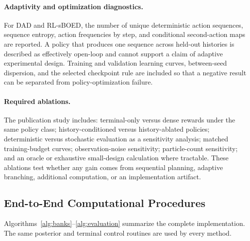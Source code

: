\documentclass[11pt]{article}
\begin{document}
\paragraph{Adaptivity and optimization diagnostics.}
For DAD and RL-sBOED, the number of unique deterministic action sequences,
sequence entropy, action frequencies by step, and conditional second-action
maps are reported. A policy that produces one sequence across held-out
histories is described as effectively open-loop and cannot support a claim of
adaptive experimental design. Training and validation learning curves,
between-seed dispersion, and the selected checkpoint rule are included so
that a negative result can be separated from policy-optimization failure.

\paragraph{Required ablations.}
The publication study includes: terminal-only versus dense rewards under the
same policy class; history-conditioned versus history-ablated policies;
deterministic versus stochastic evaluation as a sensitivity analysis; matched
training-budget curves; observation-noise sensitivity; particle-count
sensitivity; and an oracle or exhaustive small-design calculation where
tractable. These ablations test whether any gain comes from sequential
planning, adaptive branching, additional computation, or an implementation
artifact.

\subsection{End-to-End Computational Procedures}

Algorithms~\ref{alg:banks}--\ref{alg:evaluation} summarize the complete implementation. The same posterior and terminal control routines are used by every method.
\end{document}
